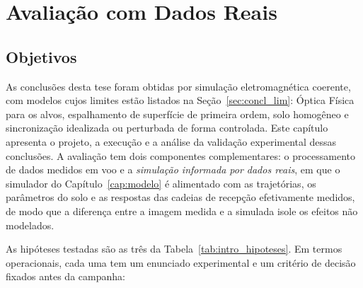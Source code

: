\documentclass[12pt,a4paper,oneside]{book}
\theoremstyle{remark}
\theoremstyle{plain}
\theoremstyle{definition}
\begin{document}
\chapter{Avaliação com Dados Reais}
\label{cap:dados_reais}


\section{Objetivos}
\label{sec:real_objetivos}

As conclusões desta tese foram obtidas por simulação eletromagnética coerente,
com modelos cujos limites estão listados na Seção~\ref{sec:concl_lim}: Óptica
Física para os alvos, espalhamento de superfície de primeira ordem, solo homogêneo
e sincronização idealizada ou perturbada de forma controlada. Este capítulo
apresenta o projeto, a execução e a análise da validação experimental dessas
conclusões. A avaliação tem dois componentes complementares: o
processamento de dados medidos em voo e a \emph{simulação informada por dados
reais}, em que o simulador do Capítulo~\ref{cap:modelo} é alimentado com as
trajetórias, os parâmetros do solo e as respostas das cadeias de recepção
efetivamente medidos, de modo que a diferença entre a imagem medida e a
simulada isole os efeitos não modelados.

As hipóteses testadas são as três da Tabela~\ref{tab:intro_hipoteses}. Em
termos operacionais, cada uma tem um enunciado experimental e um critério de
decisão fixados antes da campanha:
\end{document}
